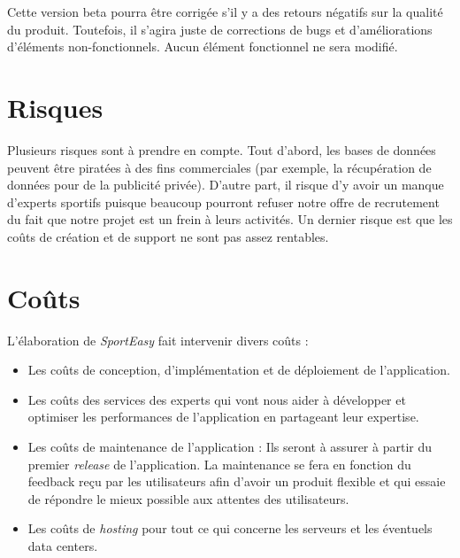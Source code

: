 Cette version \og beta \fg{} pourra être corrigée s'il y a des retours négatifs sur la qualité du produit. Toutefois, il s'agira juste de corrections de bugs et d'améliorations d'éléments non-fonctionnels. Aucun élément fonctionnel ne sera modifié. 

\section{Risques}

Plusieurs risques sont à prendre en compte. Tout d'abord, les bases de données peuvent être piratées à des fins commerciales (par exemple, la récupération de données pour de la publicité privée). D'autre part, il risque d'y avoir un manque d'experts sportifs puisque beaucoup pourront refuser notre offre de recrutement du fait que notre projet est un frein à leurs activités. Un dernier risque est que les coûts de création et de support ne sont pas assez rentables.

\section{Coûts}

L'élaboration de \textit{SportEasy} fait intervenir divers coûts :

\begin{itemize}

\item Les coûts de conception, d'implémentation et de déploiement de l'application.\\

\item Les coûts des services des experts qui vont nous aider à développer et optimiser les performances de l'application en partageant leur expertise.\\

\item Les coûts de maintenance de l'application : Ils seront à assurer à partir du premier \textit{release} de l'application. La maintenance se fera en fonction du feedback reçu par les utilisateurs afin d'avoir un produit flexible et qui essaie de répondre le mieux possible aux attentes des utilisateurs.\\

\item Les coûts de \textit{hosting} pour tout ce qui concerne les serveurs et les éventuels data centers.

\end{itemize}

